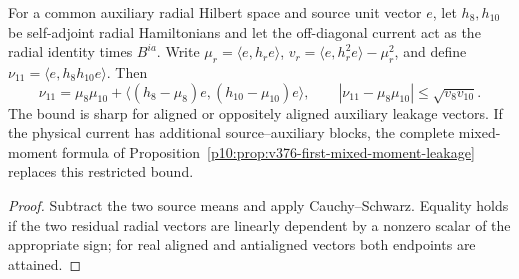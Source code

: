 \documentclass[12pt,a4paper]{article}
\begin{document}
\begin{proposition}
\label{p11:prop:v376-sharp-relative-port-moment-bound}
For a common auxiliary radial Hilbert space and source unit vector
$e$, let $h_8,h_{10}$ be self-adjoint radial Hamiltonians and
let the off-diagonal current act as the radial identity times
$B^{ia}$. Write
$\mu_r=\langle e,h_re\rangle$,
$v_r=\langle e,h_r^2e\rangle-\mu_r^2$, and define
$\nu_{11}=\langle e,h_8h_{10}e\rangle$. Then
\[
\boxed{\nu_{11}=\mu_8\mu_{10}
+\langle(h_8-\mu_8)e,(h_{10}-\mu_{10})e\rangle,
\qquad |\nu_{11}-\mu_8\mu_{10}|\le\sqrt{v_8v_{10}}.}
\]
The bound is sharp for aligned or oppositely aligned auxiliary
leakage vectors. If the physical current has additional
source--auxiliary blocks, the complete mixed-moment formula of
Proposition~\ref{p10:prop:v376-first-mixed-moment-leakage}
replaces this restricted bound.
\end{proposition}
\begin{proof}
Subtract the two source means and apply Cauchy--Schwarz.
Equality holds if the two residual radial vectors are linearly
dependent by a nonzero scalar of the appropriate sign; for real
aligned and antialigned vectors both endpoints are attained.
\end{proof}
\end{document}
